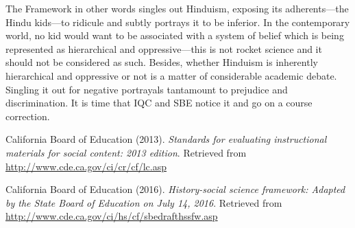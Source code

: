 The Framework in other words singles out Hinduism, exposing its adherents—the Hindu kids—to ridicule and subtly portrays it to be inferior. In the contemporary world, no kid would want to be associated with a system of belief which is being represented as hierarchical and oppressive—this is not rocket science and it should not be considered as such. Besides, whether Hinduism is inherently hierarchical and oppressive or not is a matter of considerable academic debate. Singling it out for negative portrayals tantamount to prejudice and discrimination. It is time that IQC and SBE notice it and go on a course correction. 

\begin{thebibliography}{99}
 California Board of Education (2013). \textit{Standards for evaluating instructional materials for social content: 2013 edition}. Retrieved from \url{http://www.cde.ca.gov/ci/cr/cf/lc.asp}

 California Board of Education (2016). \textit{History-social science framework: Adapted by the State Board of Education on July 14, 2016}. Retrieved from \url{http://www.cde.ca.gov/ci/hs/cf/sbedrafthssfw.asp}
\end{thebibliography}
